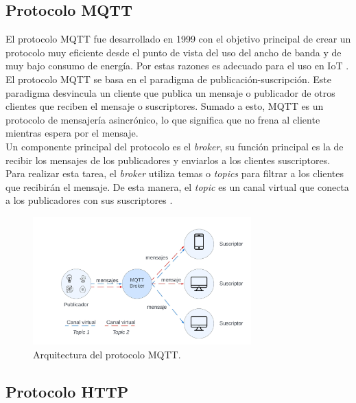 \subsection{Protocolo MQTT}
\label{sec:Protocolo MQTT}

El protocolo MQTT fue desarrollado en 1999 con el objetivo principal de crear un protocolo muy eficiente desde el punto de vista del uso del ancho de banda y de muy bajo consumo de energía. Por estas razones es adecuado para el uso en IoT \citep{mqtt:1}.\\
El protocolo MQTT se basa en el paradigma de publicación-suscripción. Este paradigma desvincula un cliente que publica un mensaje o publicador de otros clientes que reciben el mensaje o suscriptores. Sumado a esto, 
MQTT es un protocolo de mensajería asincrónico, lo que significa que no frena al cliente mientras espera por el mensaje. \\ 
Un componente principal del protocolo es el \textit{broker}, su función principal es la de recibir los mensajes de los publicadores y enviarlos  a los clientes suscriptores. Para realizar esta tarea, el \textit{broker} utiliza temas o \textit{topics} para filtrar a los clientes que recibirán el mensaje. De esta manera, el \textit{topic} es un canal virtual que conecta a los publicadores con sus suscriptores \citep{mqtt:1}.

\begin{figure}[h]
	\centering
	\includegraphics[width=0.75\textwidth]{./Figures/mqtt.jpeg}
	\caption[Arquitectura del protocolo MQTT.]{Arquitectura del protocolo MQTT\protect\footnotemark.}
	\label{fig:IotProtocols}

\end{figure}



\subsection{Protocolo HTTP}
\label{sec:Protocolo HTTP}

